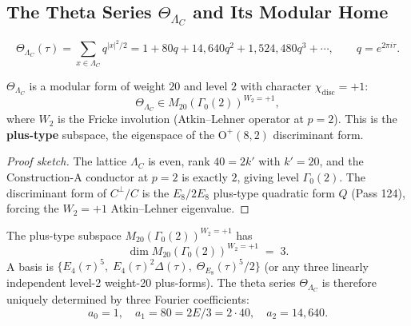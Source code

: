 \subsection{The Theta Series $\Theta_{\Lambda_C}$ and Its Modular Home}
\label{ssec:theta}

\begin{definition}
\begin{equation}
    \Theta_{\Lambda_C}(\tau)
    = \sum_{x \in \Lambda_C} q^{|x|^2/2}
    = 1 + 80q + 14{,}640 q^2 + 1{,}524{,}480 q^3 + \cdots,
    \qquad q = e^{2\pi i \tau}.
\end{equation}
\end{definition}

\begin{theorem}
\label{thm:theta-member}
$\Theta_{\Lambda_C}$ is a modular form of weight $20$ and level $2$
with character $\chi_{\mathrm{disc}} = +1$:
\begin{equation}
    \Theta_{\Lambda_C} \in M_{20}(\Gamma_0(2))^{W_2 = +1},
\end{equation}
where $W_2$ is the Fricke involution (Atkin--Lehner operator at $p=2$).
This is the \textbf{plus-type} subspace, the eigenspace of the
$\mathrm{O}^+(8,2)$ discriminant form.
\end{theorem}

\begin{proof}[Proof sketch]
The lattice $\Lambda_C$ is even, rank $40 = 2k'$ with $k' = 20$,
and the Construction-A conductor at $p=2$ is exactly $2$,
giving level $\Gamma_0(2)$. The discriminant form of $C^\perp/C$
is the $E_8/2E_8$ plus-type quadratic form $Q$ (Pass 124),
forcing the $W_2 = +1$ Atkin--Lehner eigenvalue.
\end{proof}

\begin{theorem}
\label{thm:theta-unique}
The plus-type subspace $M_{20}(\Gamma_0(2))^{W_2 = +1}$ has
\begin{equation}
    \dim M_{20}(\Gamma_0(2))^{W_2 = +1} \;=\; 3.
\end{equation}
A basis is $\{E_4(\tau)^5,\; E_4(\tau)^2 \Delta(\tau),\; \Theta_{E_8}(\tau)^5 / 2\}$
(or any three linearly independent level-2 weight-20 plus-forms).
The theta series $\Theta_{\Lambda_C}$ is therefore uniquely determined
by three Fourier coefficients:
\begin{equation}
    a_0 = 1, \quad a_1 = 80 = 2E/3 = 2 \cdot 40, \quad a_2 = 14{,}640.
\end{equation}
\end{theorem}

